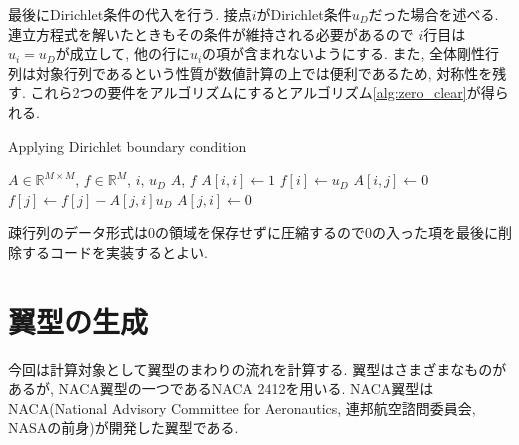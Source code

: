 \documentclass{ltjsarticle}
\begin{document}
最後にDirichlet条件の代入を行う.
接点$i$がDirichlet条件$u_D$だった場合を述べる.
連立方程式を解いたときもその条件が維持される必要があるので
$i$行目は$u_i=u_D$が成立して, 他の行に$u_i$の項が含まれないようにする.
また, 全体剛性行列は対象行列であるという性質が数値計算の上では便利であるため,
対称性を残す.
これら2つの要件をアルゴリズムにするとアルゴリズム\ref{alg:zero_clear}が得られる.
\begin{algorithm}
    \caption{Applying Dirichlet boundary condition}
    \label{alg:zero_clear}
    \begin{algorithmic}
        \Require $A \in\mathbb{R}^{M\times M}$, $f \in\mathbb{R}^{M}$, $i$, $u_D$
        \Ensure $A$, $f$
        \State $A[i,i] \leftarrow 1$
        \State $f[i] \leftarrow u_D$
            \State $A[i, j] \leftarrow 0$ 
            \State $f[j] \leftarrow  f[j] - A[j,i]u_D $
            \State $A[j,i] \leftarrow 0$
        \EndFor
    \end{algorithmic}
\end{algorithm}
疎行列のデータ形式は0の領域を保存せずに圧縮するので0の入った項を最後に削除するコードを実装するとよい.

\section{翼型の生成}
今回は計算対象として翼型のまわりの流れを計算する. 
翼型はさまざまなものがあるが, 
NACA翼型の一つであるNACA 2412を用いる.
NACA翼型はNACA(National Advisory Committee for Aeronautics, 
連邦航空諮問委員会, NASAの前身)が開発した翼型である.
\end{document}
